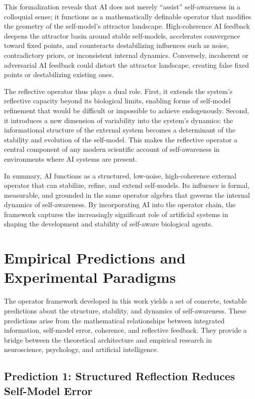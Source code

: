 \documentclass[12pt]{article}
\begin{document}
This formalization reveals that AI does not merely ``assist'' self-awareness in a colloquial sense; it functions as a mathematically definable operator that modifies the geometry of the self-model’s attractor landscape. High-coherence AI feedback deepens the attractor basin around stable self-models, accelerates convergence toward fixed points, and counteracts destabilizing influences such as noise, contradictory priors, or inconsistent internal dynamics. Conversely, incoherent or adversarial AI feedback could distort the attractor landscape, creating false fixed points or destabilizing existing ones.

The reflective operator thus plays a dual role. First, it extends the system’s reflective capacity beyond its biological limits, enabling forms of self-model refinement that would be difficult or impossible to achieve endogenously. Second, it introduces a new dimension of variability into the system’s dynamics: the informational structure of the external system becomes a determinant of the stability and evolution of the self-model. This makes the reflective operator a central component of any modern scientific account of self-awareness in environments where AI systems are present.

In summary, AI functions as a structured, low-noise, high-coherence external operator that can stabilize, refine, and extend self-models. Its influence is formal, measurable, and grounded in the same operator algebra that governs the internal dynamics of self-awareness. By incorporating AI into the operator chain, the framework captures the increasingly significant role of artificial systems in shaping the development and stability of self-aware biological agents.

\section{Empirical Predictions and Experimental Paradigms}

The operator framework developed in this work yields a set of concrete, testable predictions about the structure, stability, and dynamics of self-awareness. These predictions arise from the mathematical relationships between integrated information, self-model error, coherence, and reflective feedback. They provide a bridge between the theoretical architecture and empirical research in neuroscience, psychology, and artificial intelligence.

\subsection*{Prediction 1: Structured Reflection Reduces Self-Model Error}
\end{document}

